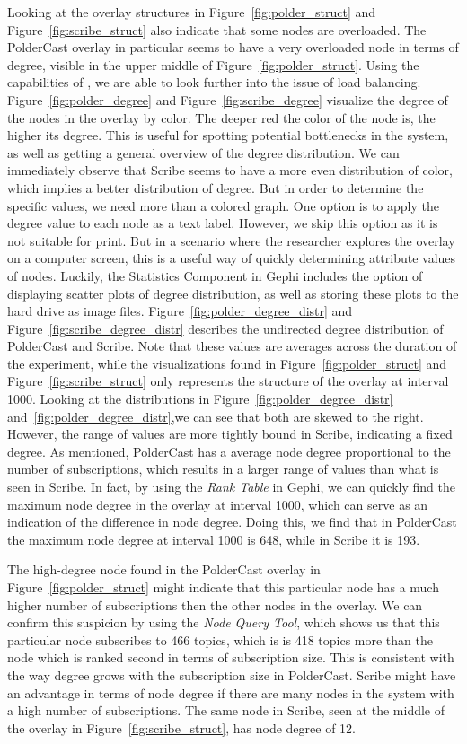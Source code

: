 Looking at the overlay structures in Figure~\ref{fig:polder_struct} and
Figure~\ref{fig:scribe_struct} also indicate that some nodes are
overloaded. The PolderCast overlay in particular seems to have a very
overloaded node in terms of degree, visible in the upper middle of
Figure~\ref{fig:polder_struct}. Using the capabilities of \demo{}, we
are able to look further into the issue of load balancing.
Figure~\ref{fig:polder_degree} and Figure~\ref{fig:scribe_degree}
visualize the degree of the nodes in the overlay by color. The deeper
red the color of the node is, the higher its degree. This is useful for
spotting potential bottlenecks in the system, as well as getting a
general overview of the degree distribution. We can immediately observe
that Scribe seems to have a more even distribution of color, which
implies a better distribution of degree. But in order to determine the
specific values, we need more than a colored graph. One option is to
apply the degree value to each node as a text label. However, we skip
this option as it is not suitable for print. But in a scenario where the
researcher explores the overlay on a computer screen, this is a useful
way of quickly determining attribute values of nodes. Luckily, the
Statistics Component in Gephi includes the option of displaying scatter
plots of degree distribution, as well as storing these plots to the hard
drive as image files.  Figure~\ref{fig:polder_degree_distr} and
Figure~\ref{fig:scribe_degree_distr} describes the undirected degree
distribution of PolderCast and Scribe. Note that these values are
averages across the duration of the experiment, while the visualizations
found in Figure~\ref{fig:polder_struct} and
Figure~\ref{fig:scribe_struct} only represents the structure of the
overlay at interval 1000. Looking at the distributions in
Figure~\ref{fig:polder_degree_distr}
and~\ref{fig:polder_degree_distr},we can see that both are skewed to the
right. However, the range of values are more tightly bound in Scribe,
indicating a fixed degree. As mentioned, PolderCast has a average node
degree proportional to the number of subscriptions, which results in a
larger range of values than what is seen in Scribe. In fact, by using
the \emph{Rank Table} in Gephi, we can quickly find the maximum node
degree in the overlay at interval 1000, which can serve as an
indication of the difference in node degree. Doing this, we find that in
PolderCast the maximum node degree at interval 1000 is 648, while in
Scribe it is 193.

The high-degree node found in the PolderCast overlay in
Figure~\ref{fig:polder_struct} might indicate that this particular node
has a much higher number of subscriptions then the other nodes in the
overlay. We can confirm this suspicion by using the \emph{Node Query
    Tool}, which shows us that this particular node subscribes to 466
topics, which is is 418 topics more than the node which is ranked second
in terms of subscription size. This is consistent with the way degree
grows with the subscription size in PolderCast. Scribe might have an
advantage in terms of node degree if there are many nodes in the system
with a high number of subscriptions. The same node in Scribe, seen at
the middle of the overlay in Figure~\ref{fig:scribe_struct}, has node
degree of 12.

